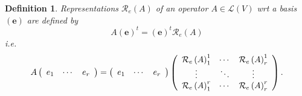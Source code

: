 \documentclass[aps,preprint]{revtex4}%
\newtheorem{definition}[theorem]{Definition}
\begin{document}
\begin{definition}
Representations $\mathcal{R}_{e}\left(  A\right)  $ of an operator
$A\in\mathcal{L}\left(  V\right)  $ wrt a basis $\left(  \boldsymbol{e}%
\right)  $ are \emph{defined by}
\begin{equation}
A\left(  \boldsymbol{e}\right)  ^{t}=\left(  \boldsymbol{e}\right)
^{t}\mathcal{R}_{e}\left(  A\right)
\end{equation}
i.e.
\begin{equation}
A\left(
\begin{array}
[c]{ccc}%
e_{1} & \cdots & e_{r}%
\end{array}
\right)  =\left(
\begin{array}
[c]{ccc}%
e_{1} & \cdots & e_{r}%
\end{array}
\right)  \left(
\begin{array}
[c]{ccc}%
\mathcal{R}_{e}\left(  A\right)  _{1}^{1} & \cdots & \mathcal{R}_{e}\left(
A\right)  _{r}^{1}\\
\vdots & \ddots & \vdots\\
\mathcal{R}_{e}\left(  A\right)  _{1}^{r} & \cdots & \mathcal{R}_{e}\left(
A\right)  _{r}^{r}%
\end{array}
\right)  .
\end{equation}

\end{definition}
\end{document}
